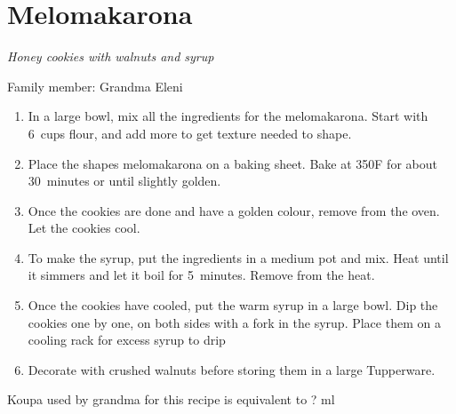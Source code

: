 \chapter{Melomakarona}
\label{ch:melomakarona}


\textit{Honey cookies with walnuts and syrup}

Family member: Grandma Eleni

\begin{enumerate}
    \item In a large bowl, mix all the ingredients for the melomakarona. Start with 6~cups flour, and add more to get texture needed to shape.
    \item Place the shapes melomakarona on a baking sheet. Bake at 350\degree F for about 30~minutes or until slightly golden.
    \item Once the cookies are done and have a golden colour, remove from the oven. Let the cookies cool.
    \item To make the syrup, put the ingredients in a medium pot and mix. Heat until it simmers and let it boil for 5~minutes. Remove from the heat.
    \item Once the cookies have cooled, put the warm syrup in a large bowl. Dip the cookies one by one, on both sides with a fork in the syrup. Place them on a cooling rack for excess syrup to drip
    \item Decorate with crushed walnuts before storing them in a large Tupperware.
\end{enumerate}

Koupa used by grandma for this recipe is equivalent to ? ml
